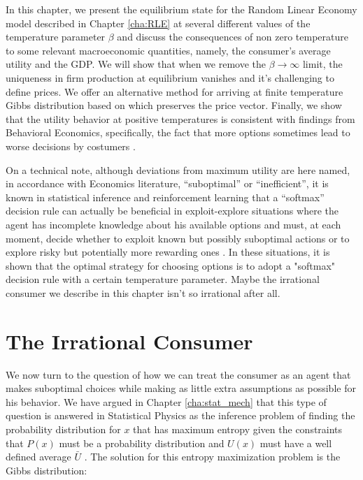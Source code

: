 In this chapter, we present the equilibrium state for the Random Linear Economy model described in Chapter \ref{cha:RLE} at several different values of the temperature parameter $\beta$ and discuss the consequences of non zero temperature to some relevant macroeconomic quantities, namely, the consumer's average utility and the GDP. We will show that when we remove the $\beta \to \infty$ limit, the uniqueness in firm production at equilibrium vanishes and it's challenging to define prices. We offer an alternative method for arriving at finite temperature Gibbs distribution based on \cite{Marsili13} which preserves the price vector. Finally, we show that the utility behavior at positive temperatures is consistent with findings from Behavioral Economics, specifically, the fact that more options sometimes lead to worse decisions by costumers \cite{Lepper00, Schwartz02}.


On a technical note, although deviations from maximum utility are here named, in accordance with Economics literature, ``suboptimal'' or ``inefficient'', it is known in statistical inference and reinforcement learning that a ``softmax'' decision
rule can actually be beneficial in exploit-explore situations where the agent has incomplete knowledge about his available options and must, at each moment, decide whether to exploit known but possibly suboptimal actions or to explore risky but potentially more rewarding ones \cite{cohen2007}. In these situations, it is shown that the optimal strategy for choosing options is to adopt a "softmax" decision rule with a certain temperature parameter. Maybe the irrational consumer we describe in this chapter isn't so irrational after all.



\section{The Irrational Consumer}

We now turn to the question of how we can treat the consumer as an
agent that makes suboptimal choices while making as
little extra assumptions as possible for his behavior. We have argued in Chapter \ref{cha:stat_mech} that this type of question
is answered in Statistical Physics as the inference problem of finding the
probability distribution for $x$ that has maximum entropy given the
constraints that $P(x)$ must be a probability distribution and $U(x)$ must have a well defined average $\bar{U}$
\cite{Jaynes57}. The solution for this entropy maximization
problem is the Gibbs distribution:

